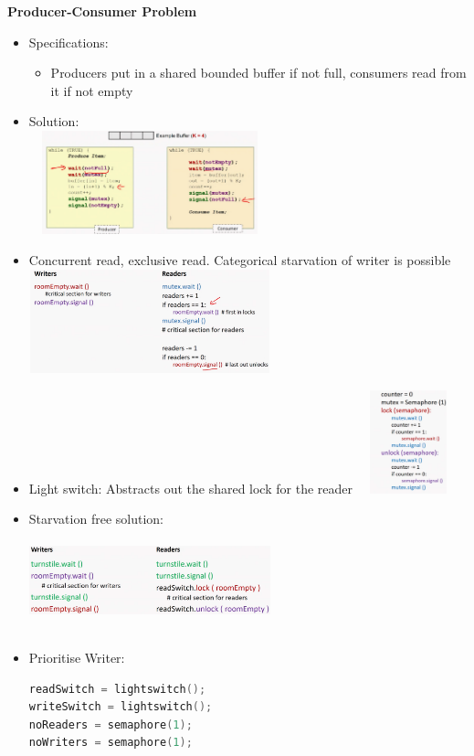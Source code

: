 \documentclass[10pt, landscape]{article}
\begin{document}
\begin{multicols}{4}
\textbf{Producer-Consumer Problem} \\
\begin{itemize}
    \item Specifications:
    \begin{itemize}
        \item Producers put in a shared bounded buffer if not full, consumers read from it if not empty
    \end{itemize}
    \item Solution:\\
    \includegraphics*[width = 7cm, height = 3cm]{producerConsumer.png} \\ 
    \item Concurrent read, exclusive read. Categorical starvation of writer is possible\\ 
    \includegraphics*[width = 7cm, height = 3cm]{readerwritter1.png} \\
    \item Light switch: Abstracts out the shared lock for the reader 
    \includegraphics*[width = 3cm, height = 3cm]{lightswitch.png} \\
    \item Starvation free solution: \\
    \includegraphics*[width = 7cm, height = 3cm]{turnstile.png} \\
    \item Prioritise Writer: \\
\begin{lstlisting}[language=C++, breaklines=true, breakatwhitespace=true]
readSwitch = lightswitch();
writeSwitch = lightswitch();
noReaders = semaphore(1);
noWriters = semaphore(1);


\end{lstlisting}
\end{itemize}
\end{multicols}
\end{document}

